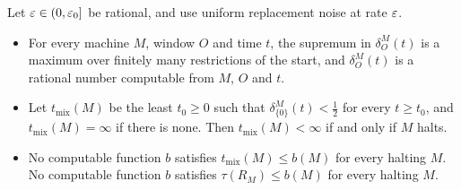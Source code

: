 \begin{corollary}\label{cor:mixing}
Let $\varepsilon\in(0,\varepsilon_0]$ be rational, and use uniform replacement noise at rate $\varepsilon$.
\begin{itemize}
\item[(i)] For every machine $M$, window $O$ and time $t$, the supremum in $\delta^M_O(t)$ is a maximum over finitely many restrictions of the start, and $\delta^M_O(t)$ is a rational number computable from $M$, $O$ and $t$.
\item[(ii)] Let $t_{\mathrm{mix}}(M)$ be the least $t_0\ge0$ such that $\delta^M_{\{0\}}(t)<\frac12$ for every $t\ge t_0$, and $t_{\mathrm{mix}}(M)=\infty$ if there is none. Then $t_{\mathrm{mix}}(M)<\infty$ if and only if $M$ halts.
\item[(iii)] No computable function $b$ satisfies $t_{\mathrm{mix}}(M)\le b(M)$ for every halting $M$. No computable function $b$ satisfies $\tau(R_M)\le b(M)$ for every halting $M$.
\end{itemize}
\end{corollary}

